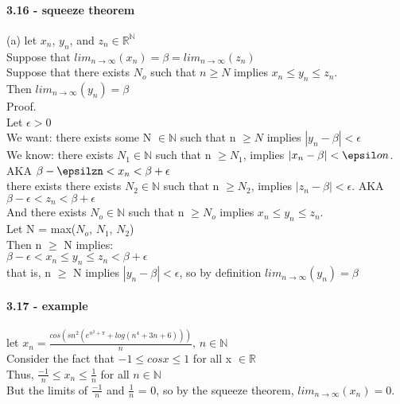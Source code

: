 \documentclass[10pt,letter]{article}
\begin{document}
\paragraph{3.16 - squeeze theorem}
(a)
let $x_n$, $y_n$, and $z_n \in \mathbb{R}^\mathbb{N}$\\
Suppose that $lim_{n\rightarrow\infty} (x_n) = \beta = lim_{n\rightarrow\infty} (z_n)$ \\
Suppose that there exists $N_o$ such that $n \geq N$ implies $x_n \leq y_n \leq z_n$.\\
Then $lim_{n\rightarrow\infty} (y_n) = \beta$\\
Proof. \\
Let $\epsilon > 0$\\
We want: there exists some N $\in \mathbb{N}$ such that n $\geq N$ implies $|y_n - \beta| < \epsilon$\\
We know: there exists $N_1 \in \mathbb{N}$ such that n $\geq N_1$, implies $|x_n - \beta| < \epsil on$. AKA $\beta - \epsilzn < x_n < \beta + \epsilon$\\ 
there exists there exists $N_2 \in \mathbb{N}$ such that n $\geq N_2$, implies $|z_n - \beta| < \epsilon$. AKA $\beta - \epsilon < z_n < \beta + \epsilon$\\ 
And there exists $N_o \in \mathbb{N}$ such that n $\geq N_o$ implies $x_n \leq y_n \leq z_n$.\\
Let N = max($N_o$, $N_1$, $N_2$)\\
Then n $\geq$ N implies: \\
$\beta - \epsilon < x_n \leq y_n \leq z_n < \beta + \epsilon$\\
that is, n $\geq$ N implies $|y_n - \beta| < \epsilon$, so by definition $lim_{n\rightarrow\infty}(y_n) = \beta$\\
\paragraph{3.17 - example}
let $x_n = \frac{cos(sn^2(e^{n^2+\pi}+log(n^4+3n+6)))}{n}$, $n \in \mathbb{N}$\\
Consider the fact that $-1 \leq cosx \leq 1$ for all x $\in \mathbb{R}$\\
Thus, $\frac{-1}{n} \leq x_n \leq \frac{1}{n}$ for all $n \in \mathbb{N}$\\
But the limits of $\frac{-1}{n}$ and $\frac{1}{n}$ = 0, so by the squeeze theorem, $lim_{n\rightarrow\infty}(x_n) = 0$.
\end{document}
